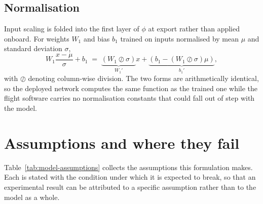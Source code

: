 \subsection{Normalisation}

Input scaling is folded into the first layer of $\phi$ at export rather than applied onboard. For
weights $W_1$ and bias $b_1$ trained on inputs normalised by mean $\mu$ and standard deviation
$\sigma$,
%
\begin{equation}
  W_1 \frac{x - \mu}{\sigma} + b_1
  \;=\; \underbrace{\left(W_1 \oslash \sigma\right)}_{W_1'} x
      + \underbrace{\left(b_1 - \left(W_1 \oslash \sigma\right)\mu\right)}_{b_1'},
  \label{eq:model-fold}
\end{equation}
%
with $\oslash$ denoting column-wise division. The two forms are arithmetically identical, so the
deployed network computes the same function as the trained one while the flight software carries no
normalisation constants that could fall out of step with the model.

\section{Assumptions and where they fail}
\label{sec:model-assumptions}

Table~\ref{tab:model-assumptions} collects the assumptions this formulation makes. Each is stated
with the condition under which it is expected to break, so that an experimental result can be
attributed to a specific assumption rather than to the model as a whole.

